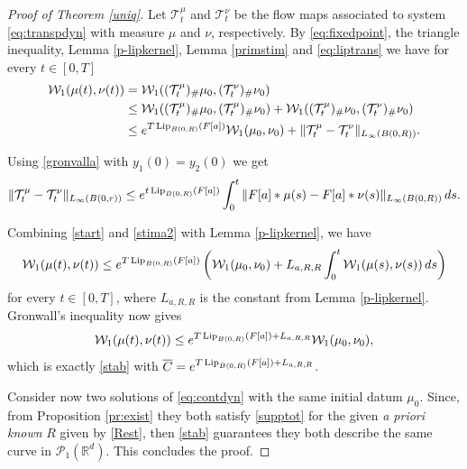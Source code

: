 \documentclass[A4paper,11pt]{article}
\theoremstyle{definition}
\newcommand{\Lip}{\textup{Lip}}
\newcommand{\R}{\mathbb{R}}
\newcommand{\W}{\mathcal{W}}
\newcommand{\PP}{\mathcal{P}_1}
\begin{document}
\begin{proof}[Proof of Theorem \ref{uniq}]
Let  ${\mathcal T}^\mu_t$ and ${\mathcal T}^\nu_t$ be the flow maps associated to system \eqref{eq:transpdyn} with measure $\mu$ and $\nu$, respectively.
By \eqref{eq:fixedpoint}, the triangle inequality, Lemma \ref{p-lipkernel}, Lemma \ref{primstim} and \eqref{eq:liptrans} we have for every $t \in [0,T]$
\begin{align}
\begin{split}\label{start}
\W_1(\mu(t), \nu(t))&=\W_1(({\mathcal T}^\mu_t)_{\#} \mu_0, ({\mathcal T}^\nu_t)_{\#} \nu_0)  \\
&\le \W_1(({\mathcal T}^\mu_t)_{\#} \mu_0, ({\mathcal T}^\mu_t)_{\#} \nu_0) + \W_1(({\mathcal T}^\mu_t)_{\#} \nu_0, ({\mathcal T}^\nu_t)_{\#} \nu_0)\\
&\le e^{T \, \Lip_{B(0,R)}(F[a])} \W_1(\mu_0, \nu_0)+\|{\mathcal T}^\mu_t-{\mathcal T}^\nu_t\|_{L_\infty(B(0,R))}.
\end{split}
\end{align}

Using \eqref{gronvalla} with $y_1(0)= y_2(0)$ we get
\begin{equation}\label{stima2}
\|{\mathcal T}^\mu_t-{\mathcal T}^\nu_t\|_{L_\infty(B(0,r))}\le e^{t \, \Lip_{B(0,R)}(F[a])}\int_0^t \|F[a]* \mu(s)-F[a]* \nu(s)\|_{L_\infty(B(0,R))}\,ds.
\end{equation}

Combining \eqref{start} and \eqref{stima2} with Lemma \ref{p-lipkernel}, we have
$$
\W_1(\mu(t), \nu(t))\le e^{T \, \Lip_{B(0,R)}(F[a])} \left(\W_1(\mu_0, \nu_0)+ L_{a,R,R}\int_0^t \W_1(\mu(s), \nu(s)) \,ds\right)
$$
for every $t \in [0, T]$, where $L_{a,R,R}$ is the constant from Lemma \ref{p-lipkernel}. Gronwall's inequality now gives
$$
\W_1(\mu(t), \nu(t))\le e^{T \, \Lip_{B(0,R)}(F[a]) + L_{a,R,R}} \W_1(\mu_0, \nu_0),
$$
which is exactly \eqref{stab} with $\overline{C}= e^{T \, \Lip_{B(0,R)}(F[a]) + L_{a,R,R}}$.

Consider now two solutions of \eqref{eq:contdyn} with the same initial datum $\mu_0$. Since, from Proposition \ref{pr:exist} they both satisfy \eqref{supptot} for the given \textit{a priori known} $R$ given by \eqref{Rest}, then \eqref{stab} guarantees they both describe the same curve in $\PP(\R^d)$. This concludes the proof.
\end{proof}


	
\end{document}
